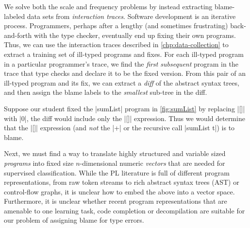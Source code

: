 %
We solve both the scale and
frequency problems by instead
extracting blame-labeled data sets
from \emph{interaction traces}.
%
Software development is an iterative process.
Programmers, perhaps after a lengthy (and
sometimes frustrating) back-and-forth with
the type checker, eventually end up fixing
their own programs.
%
Thus, we can use the interaction traces described
in \autoref{chp:data-collection} to extract a training
set of ill-typed programs and fixes.
%
For each ill-typed program in
a particular programmer's trace,
we find the \emph{first subsequent}
program in the trace that type checks
and declare it to be the fixed version.
%
From this pair of an ill-typed program
and its fix, we can extract a \emph{diff}
of the abstract syntax trees, and then assign
the blame labels to the \emph{smallest}
sub-tree in the diff.


Suppose our student
fixed the |sumList| program in
\autoref{fig:sumList} by replacing
|[]| with |0|, the diff would
include only the |[]| expression.
%
Thus we would determine that the
|[]| expression (and \emph{not} the
|+| or the recursive call |sumList t|)
is to blame.



Next, we must find a way to translate
highly structured and variable sized
\emph{programs} into fixed size
$n$-dimensional numeric \emph{vectors}
that are needed for supervised
classification.
%
While the PL literature is full
of different program
representations, from raw
token streams to
rich %
abstract syntax trees (AST) or
control-flow graphs, it is
unclear how to embed the
above into a vector space.
%
Furthermore, it is unclear whether
recent program representations that
are amenable to one learning task,
\eg code completion \citep{Hindle2012-hf,Raychev2014-jv}
or decompilation \citep{Raychev2015-jg,Bielik2016-br}
are suitable for our problem of
assigning blame for type errors.

